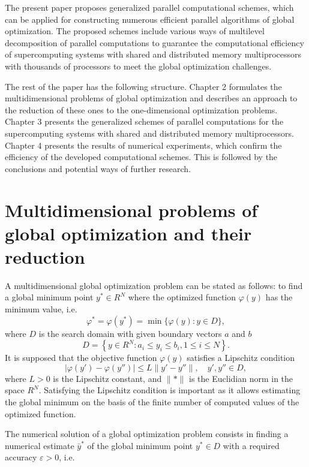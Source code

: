 \documentclass[
11pt,%
tightenlines,%
twoside,%
onecolumn,%
nofloats,%
nobibnotes,%
nofootinbib,%
superscriptaddress,%
noshowpacs,%
centertags]%
{revtex4}
\begin{document}
The present paper proposes generalized parallel computational schemes, which can be applied for constructing numerous efficient parallel algorithms of global optimization. The proposed schemes include various ways of multilevel decomposition of parallel computations to guarantee the computational efficiency of supercomputing systems with shared and distributed memory multiprocessors with thousands of processors to meet the global optimization challenges.

The rest of the paper has the following structure. Chapter 2 formulates the multidimensional problems of global optimization and describes an approach to the reduction of these ones to the one-dimensional optimization problems. Chapter 3 presents the generalized schemes of parallel computations for the supercomputing systems with shared and distributed memory multiprocessors. Chapter 4 presents the results of numerical experiments, which confirm the efficiency of the developed computational schemes. This is followed by the conclusions and potential ways of further research.


\section{Multidimensional problems of global optimization and their reduction}

A multidimensional global optimization problem can be stated as follows: to find a global minimum point $y^\ast \in R^N$ where the optimized function $\varphi(y)$ has the minimum value, i.e.
\begin{equation}
\varphi^\ast = \varphi(y^\ast) = \min \{\varphi(y): y\in D \},
\end{equation}
where $D$ is the search domain with given boundary vectors $a$ and $b$
\[
D=\left\{y\in R^N: a_i\leq y_i \leq b_i, 1\leq i \leq N\right\}.
\]
It is supposed that the objective function $\varphi(y)$ satisfies a Lipschitz condition
\begin{equation}
\vert \varphi(y') - \varphi(y'') \vert \leq L\| y' - y'' \|, \quad y', y'' \in D,
\end{equation}
where $L > 0$ is the Lipschitz constant, and $\|\ast\|$ is the Euclidian norm in the space $R^N$. Satisfying the Lipschitz condition is important as it allows estimating the global minimum on the basis of the finite number of computed values of the optimized function.

The numerical solution of a global optimization problem consists in finding a numerical estimate $\bar{y}^\ast$ of the global minimum point $y^\ast \in D$ with a required accuracy $\varepsilon > 0$, i.e.
\end{document}
